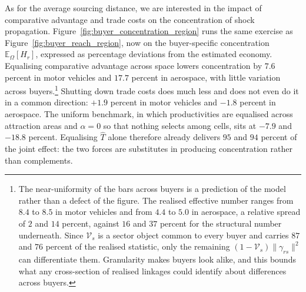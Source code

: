 As for the average sourcing distance, we are interested in the impact of comparative advantage and trade costs on the concentration of shock propagation. Figure~\ref{fig:buyer_concentration_region} runs the same exercise as Figure~\ref{fig:buyer_reach_region}, now on the buyer-specific concentration $\mathbb{E}_{\Omega}[H_{r}]$, expressed as percentage deviations from the estimated economy. Equalising comparative advantage across space lowers concentration by $7.6$ percent in motor vehicles and $17.7$ percent in aerospace, with little variation across buyers.\footnote{The near-uniformity of the bars across buyers is a prediction of the model rather than a defect of the figure. The realised effective number ranges from $8.4$ to $8.5$ in motor vehicles and from $4.4$ to $5.0$ in aerospace, a relative spread of $2$ and $14$ percent, against $16$ and $37$ percent for the structural number underneath. Since $\mathcal{V}_{s}$ is a sector object common to every buyer and carries $87$ and $76$ percent of the realised statistic, only the remaining $(1-\mathcal{V}_{s})\|\gamma_{rs}\|^{2}$ can differentiate them. Granularity makes buyers look alike, and this bounds what any cross-section of realised linkages could identify about differences across buyers.} Shutting down trade costs does much less and does not even do it in a common direction: $+1.9$ percent in motor vehicles and $-1.8$ percent in aerospace. The uniform benchmark, in which productivities are equalised across attraction areas and $\alpha=0$ so that nothing selects among cells, sits at $-7.9$ and $-18.8$ percent. Equalising $\hat T$ alone therefore already delivers $95$ and $94$ percent of the joint effect: the two forces are substitutes in producing concentration rather than complements. 

